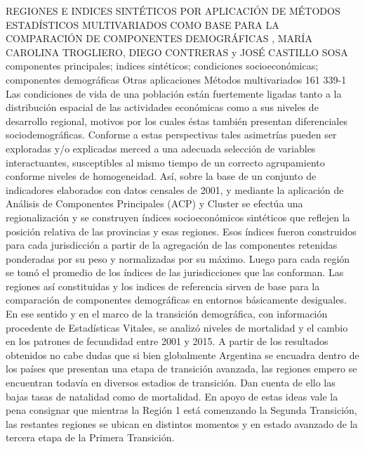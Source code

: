 \A
{REGIONES E INDICES SINTÉTICOS POR APLICACIÓN DE MÉTODOS ESTADÍSTICOS MULTIVARIADOS COMO BASE PARA LA COMPARACIÓN DE COMPONENTES DEMOGRÁFICAS}
{, MARÍA CAROLINA TROGLIERO, DIEGO CONTRERAS y JOSÉ CASTILLO SOSA}
{
\\}
{componentes principales; indices sintéticos; condiciones socioeconómicas; componentes demográficas} 
 {Otras aplicaciones} 
 {Métodos multivariados} 
 {161} 
 {339-1}
{Las condiciones de vida de una población están fuertemente ligadas tanto a la distribución espacial de las actividades económicas como a sus niveles de desarrollo regional, motivos por los cuales éstas también presentan diferenciales sociodemográficas. Conforme a estas perspectivas tales asimetrías pueden ser exploradas y/o explicadas merced a una adecuada selección de variables interactuantes, susceptibles al mismo tiempo de un correcto agrupamiento conforme niveles de homogeneidad. Así, sobre la base de un conjunto de indicadores elaborados con datos censales de 2001, y mediante la aplicación de Análisis de Componentes Principales (ACP) y Cluster se efectúa una regionalización y se construyen índices socioeconómicos sintéticos que reflejen la posición relativa de las provincias y esas regiones. Esos índices fueron construidos para cada jurisdicción a partir de la agregación de las componentes retenidas ponderadas por su peso y normalizadas por su máximo. Luego para cada región se tomó el promedio de los índices de las jurisdicciones que las conforman. Las regiones así constituidas y los indices de referencia sirven de base para la comparación de componentes demográficas en entornos básicamente desiguales. En ese sentido y en el marco de la transición demográfica, con información procedente de Estadísticas Vitales, se analizó niveles de mortalidad y el cambio en los patrones de fecundidad entre 2001 y 2015. A partir de los resultados obtenidos no cabe dudas que si bien globalmente Argentina se encuadra dentro de los países que presentan una etapa de transición avanzada, las regiones empero se encuentran todavía en diversos estadios de transición. Dan cuenta de ello las bajas tasas de natalidad como de mortalidad. En apoyo de estas ideas vale la pena consignar que mientras la Región 1 está comenzando la Segunda Transición, las restantes regiones se ubican en distintos momentos y en estado avanzado de la tercera etapa de la Primera Transición.}
